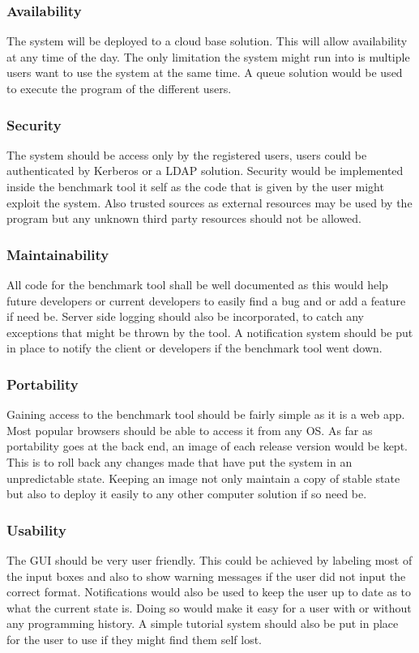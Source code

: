 \documentclass[a4paper,12pt]{article}
\begin{document}
\subsubsection{Availability}
The system will be deployed to a cloud base solution. This will allow availability at any time of the day. The only limitation the system might run into is multiple users want to use the system at the same time. A queue solution would be used to execute the program of the different users.
\subsubsection{ Security }
The system should be access only by the registered users, users could be authenticated by Kerberos or a LDAP solution. Security would be implemented inside the benchmark tool it self as the code that is given by the user might exploit the system. Also trusted sources as external resources may be used by the program but any unknown third party resources should not be allowed.   
\subsubsection{Maintainability}
All code for the benchmark tool shall be well documented as this would help future developers or current developers to easily find a bug and or add a feature if need be. Server side logging should also be incorporated, to catch any exceptions that might be thrown by the tool. A notification system should be put in place to notify the client or developers if the benchmark tool went down.
\subsubsection{Portability}
Gaining access to the benchmark tool should be fairly simple as it is a web app. Most popular browsers should be able to access it from any OS. As far as portability goes at the back end, an image of each release version would be kept. This is to roll back any changes made that have put the system in an unpredictable state. Keeping an image not only maintain a copy of stable state but also to deploy it easily to any other computer solution if so need be. 
\subsubsection{Usability}
 The GUI should be very user friendly. This could be achieved by labeling most of the input boxes and also to show warning messages if the user did not input the correct format. Notifications would also be used to keep the user up to date as to what the current state is. Doing so would make it easy for a user with or without any programming history. A simple tutorial system should also be put in place for the user to use if they might find them self lost.

\newpage
\clearpage
{}
\end{document}
